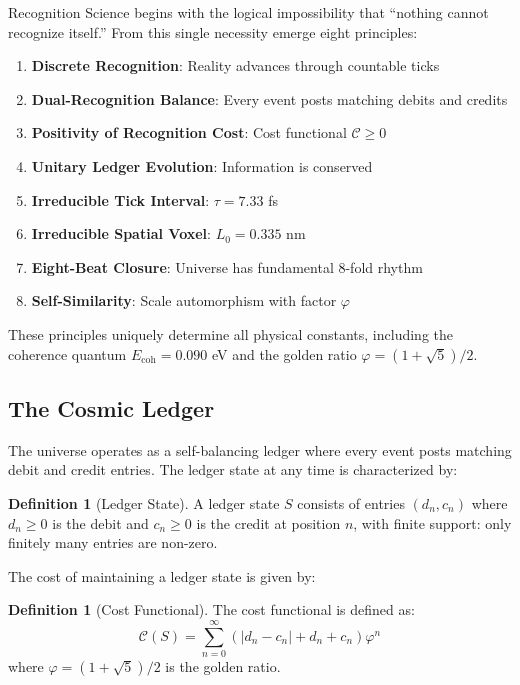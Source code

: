 \documentclass[11pt]{article}
\numberwithin{equation}{section}
\theoremstyle{definition}
\newtheorem{definition}[theorem]{Definition}
\theoremstyle{remark}
\begin{document}
Recognition Science begins with the logical impossibility that ``nothing cannot recognize itself.'' From this single necessity emerge eight principles:

\begin{enumerate}
\item \textbf{Discrete Recognition}: Reality advances through countable ticks
\item \textbf{Dual-Recognition Balance}: Every event posts matching debits and credits  
\item \textbf{Positivity of Recognition Cost}: Cost functional $\mathcal{C} \geq 0$
\item \textbf{Unitary Ledger Evolution}: Information is conserved
\item \textbf{Irreducible Tick Interval}: $\tau = 7.33$ fs
\item \textbf{Irreducible Spatial Voxel}: $L_0 = 0.335$ nm
\item \textbf{Eight-Beat Closure}: Universe has fundamental 8-fold rhythm
\item \textbf{Self-Similarity}: Scale automorphism with factor $\varphi$
\end{enumerate}

These principles uniquely determine all physical constants, including the coherence quantum $E_{\text{coh}} = 0.090$ eV and the golden ratio $\varphi = (1+\sqrt{5})/2$.

\subsection{The Cosmic Ledger}

The universe operates as a self-balancing ledger where every event posts matching debit and credit entries. The ledger state at any time is characterized by:

\begin{definition}[Ledger State]
A ledger state $S$ consists of entries $(d_n, c_n)$ where $d_n \geq 0$ is the debit and $c_n \geq 0$ is the credit at position $n$, with finite support: only finitely many entries are non-zero.
\end{definition}

The cost of maintaining a ledger state is given by:

\begin{definition}[Cost Functional]
The cost functional is defined as:
\begin{equation}
\mathcal{C}(S) = \sum_{n=0}^{\infty} \left(|d_n - c_n| + d_n + c_n\right) \varphi^n
\end{equation}
where $\varphi = (1+\sqrt{5})/2$ is the golden ratio.
\end{definition}
\end{document}
